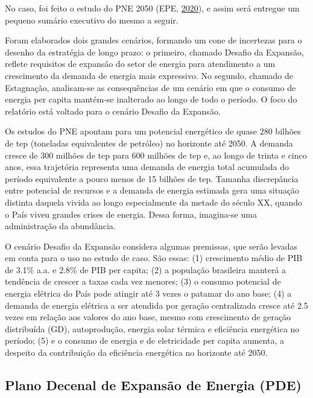 \documentclass[grad,numbers]{coppe}
\begin{document}
  No caso, foi feito o estudo do PNE 2050 (EPE, \protect\hyperlink{ref-epe2020}{2020}), e assim será entregue um pequeno sumário executivo do mesmo a seguir.

  Foram elaborados dois grandes cenários, formando um cone de incertezas para o desenho da estratégia de longo prazo: o primeiro, chamado Desafio da Expansão, reflete requisitos de expansão do setor de energia para atendimento a um crescimento da demanda de energia mais expressivo. No segundo, chamado de Estagnação, analisam-se as consequências de um cenário em que o consumo de energia per capita mantém-se inalterado ao longo de todo o período. O foco do relatório está voltado para o cenário Desafio da Expansão.

  Os estudos do PNE apontam para um potencial energético de quase 280 bilhões de tep (toneladas equivalentes de petróleo) no horizonte até 2050. A demanda cresce de 300 milhões de tep para 600 milhões de tep e, ao longo de trinta e cinco anos, essa trajetória representa uma demanda de energia total acumulada do período equivalente a pouco menos de 15 bilhões de tep. Tamanha discrepância entre potencial de recursos e a demanda de energia estimada gera uma situação distinta daquela vivida ao longo especialmente da metade do século XX, quando o País viveu grandes crises de energia. Dessa forma, imagina-se uma administração da abundância.

  O cenário Desafio da Expansão considera algumas premissas, que serão levadas em conta para o uso no estudo de caso. São essas: (1) crescimento médio de PIB de 3.1\% a.a. e 2.8\% de PIB per capita; (2) a população brasileira manterá a tendência de crescer a taxas cada vez menores; (3) o consumo potencial de energia elétrica do País pode atingir até 3 vezes o patamar do ano base; (4) a demanda de energia elétrica a ser atendida por geração centralizada cresce até 2.5 vezes em relação aos valores do ano base, mesmo com crescimento de geração distribuída (GD), autoprodução, energia solar térmica e eficiência energética no período; (5) e o consumo de energia e de eletricidade per capita aumenta, a despeito da contribuição da eficiência energética no horizonte até 2050.

  \hypertarget{plano-decenal-de-expansuxe3o-de-energia-pde}{%
  \subsection{Plano Decenal de Expansão de Energia (PDE)}\label{plano-decenal-de-expansuxe3o-de-energia-pde}}
\end{document}
